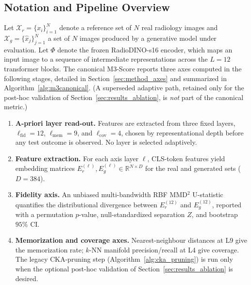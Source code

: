 \documentclass[lettersize,journal]{IEEEtran}
\begin{document}
\subsection{Notation and Pipeline Overview}
\label{sec:method_overview}

Let $\mathcal{X}_r = \{x_i\}_{i=1}^{N}$ denote a reference set of $N$ real radiology images and $\mathcal{X}_g = \{\hat{x}_j\}_{j=1}^{N}$ a set of $N$ images produced by a generative model under evaluation. Let $\Phi$ denote the frozen RadioDINO-s16 encoder, which maps an input image to a sequence of intermediate representations across the $L = 12$ transformer blocks. The canonical M3-Score reports three axes computed in the following stages, detailed in Section~\ref{sec:method_axes} and summarized in Algorithm~\ref{alg:m3canonical}. (A superseded adaptive path, retained only for the post-hoc validation of Section~\ref{sec:results_ablation}, is \emph{not} part of the canonical metric.)

\begin{enumerate}[leftmargin=*,label=\arabic*.,itemsep=0.3em]
  \item \textbf{A-priori layer read-out.}
        Features are extracted from three fixed layers, $\ell_{\text{fid}} = 12$, $\ell_{\text{mem}} = 9$, and $\ell_{\text{cov}} = 4$, chosen by representational depth before any test outcome is observed. No layer is selected adaptively.
  \item \textbf{Feature extraction.}
        For each axis layer $\ell$, CLS-token features yield embedding matrices $E_r^{(\ell)}, E_g^{(\ell)} \in \mathbb{R}^{N \times D}$ for the real and generated sets ($D = 384$).
  \item \textbf{Fidelity axis.}
        An unbiased multi-bandwidth RBF MMD$^2$ U-statistic quantifies the distributional divergence between $E_r^{(12)}$ and $E_g^{(12)}$, reported with a permutation $p$-value, null-standardized separation $Z$, and bootstrap $95\%$ CI.
  \item \textbf{Memorization and coverage axes.}
        Nearest-neighbour distances at L9 give the memorization rate; $k$-NN manifold precision/recall at L4 give coverage. The legacy CKA-pruning step (Algorithm~\ref{alg:cka_pruning}) is run only when the optional post-hoc validation of Section~\ref{sec:results_ablation} is desired.
\end{enumerate}
\end{document}
